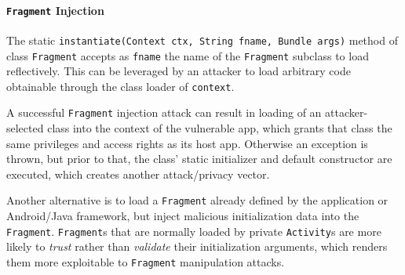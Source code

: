 \paragraph{{\tt Fragment} Injection} The static {\tt instantiate(Context ctx, String fname, Bundle args)} method of class {\tt Fragment} accepts as {\tt fname} the name of the {\tt Fragment} subclass to load reflectively. This can be leveraged by an attacker to load arbitrary code obtainable through the class loader of {\tt context}. 

A successful {\tt Fragment} injection attack can result in loading of an attacker-selected class into the context of the vulnerable app, which grants that class the same privileges and access rights as its host app.
Otherwise an exception is thrown, but prior to that, the class' static initializer and default constructor are executed, which creates another attack/privacy vector.

Another alternative is to load a {\tt Fragment} already defined by the application or Android/Java framework, but inject malicious initialization data into the {\tt Fragment}. {\tt Fragment}s that are normally loaded by private {\tt Activity}s are more likely to \emph{trust} rather than \emph{validate} their initialization arguments, which renders them more exploitable to {\tt Fragment} manipulation attacks.
%


%



